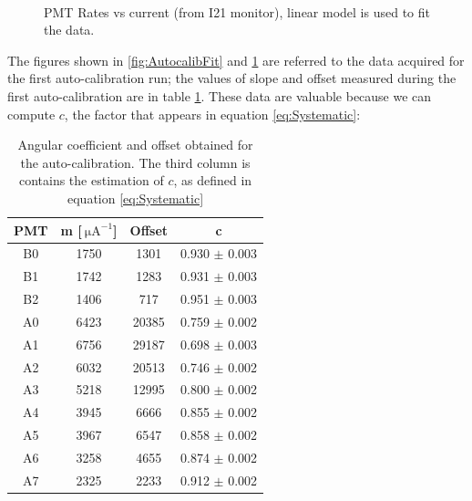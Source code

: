 \begin{figure}[!hbtp]
\centering
{} \\
\caption{PMT Rates vs current (from I21 monitor), linear model is used to fit the data.} 
\label{fig:AutoBcalibFit}
\end{figure}

The figures shown in \ref{fig:AutocalibFit} and \ref{fig:AutoBcalibFit} are referred to the data acquired for the first auto-calibration run; the values of slope and offset measured during the first auto-calibration are in table \ref{tab:PMToffset}. These data are valuable because we can compute $c$, the factor that appears in equation \ref{eq:Systematic}:
\begin{table}[!ht]
\centering
\begin{tabular}{c|c|c|c}
\hline
 PMT & m [$\SI{}{\micro \ampere}^{-1}$] & Offset & c  \\
\hline
 B0  & 1750 &  1301 &  0.930 $\pm$ 0.003\\
 B1  & 1742 &  1283 &  0.931 $\pm$ 0.003\\
 B2  & 1406 &   717 &  0.951 $\pm$ 0.003\\
 A0  & 6423 & 20385 &  0.759 $\pm$ 0.002\\
 A1  & 6756 & 29187 &  0.698 $\pm$ 0.003\\
 A2  & 6032 & 20513 &  0.746 $\pm$ 0.002\\
 A3  & 5218 & 12995 &  0.800 $\pm$ 0.002\\
 A4  & 3945 &  6666 &  0.855 $\pm$ 0.002\\
 A5  & 3967 &  6547 &  0.858 $\pm$ 0.002\\
 A6  & 3258 &  4655 &  0.874 $\pm$ 0.002\\
 A7  & 2325 &  2233 &  0.912 $\pm$ 0.002\\
\hline
\end{tabular}
\caption{Angular coefficient and offset obtained for the auto-calibration. The third column is contains the estimation of $c$, as defined in equation \ref{eq:Systematic}}
\label{tab:PMToffset}
\end{table}

